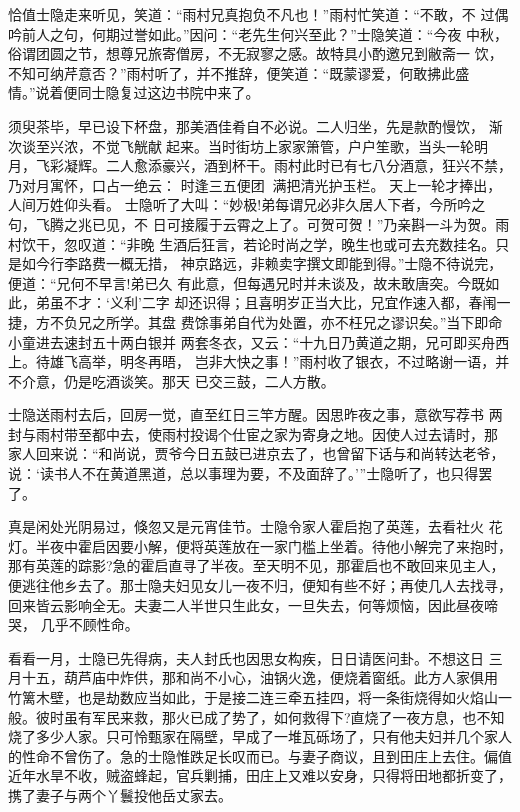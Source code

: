 恰值士隐走来听见，笑道：“雨村兄真抱负不凡也！”雨村忙笑道：“不敢，不
过偶吟前人之句，何期过誉如此。”因问：“老先生何兴至此？”士隐笑道：“今夜
中秋，俗谓团圆之节，想尊兄旅寄僧房，不无寂寥之感。故特具小酌邀兄到敝斋一
饮，不知可纳芹意否？”雨村听了，并不推辞，便笑道：“既蒙谬爱，何敢拂此盛
情。”说着便同士隐复过这边书院中来了。

须臾茶毕，早已设下杯盘，那美酒佳肴自不必说。二人归坐，先是款酌慢饮，
渐次谈至兴浓，不觉飞觥献起来。当时街坊上家家箫管，户户笙歌，当头一轮明
月，飞彩凝辉。二人愈添豪兴，酒到杯干。雨村此时已有七八分酒意，狂兴不禁，
乃对月寓怀，口占一绝云：
时逢三五便团，满把清光护玉栏。
天上一轮才捧出，人间万姓仰头看。
士隐听了大叫：“妙极!弟每谓兄必非久居人下者，今所吟之句，飞腾之兆已见，不
日可接履于云霄之上了。可贺可贺！”乃亲斟一斗为贺。雨村饮干，忽叹道：“非晚
生酒后狂言，若论时尚之学，晚生也或可去充数挂名。只是如今行李路费一概无措，
神京路远，非赖卖字撰文即能到得。”士隐不待说完，便道：“兄何不早言!弟已久
有此意，但每遇兄时并未谈及，故未敢唐突。今既如此，弟虽不才：‘义利’二字
却还识得；且喜明岁正当大比，兄宜作速入都，春闱一捷，方不负兄之所学。其盘
费馀事弟自代为处置，亦不枉兄之谬识矣。”当下即命小童进去速封五十两白银并
两套冬衣，又云：“十九日乃黄道之期，兄可即买舟西上。待雄飞高举，明冬再晤，
岂非大快之事！”雨村收了银衣，不过略谢一语，并不介意，仍是吃酒谈笑。那天
已交三鼓，二人方散。

士隐送雨村去后，回房一觉，直至红日三竿方醒。因思昨夜之事，意欲写荐书
两封与雨村带至都中去，使雨村投谒个仕宦之家为寄身之地。因使人过去请时，那
家人回来说：“和尚说，贾爷今日五鼓已进京去了，也曾留下话与和尚转达老爷，
说：‘读书人不在黄道黑道，总以事理为要，不及面辞了。’”士隐听了，也只得罢
了。

真是闲处光阴易过，倏忽又是元宵佳节。士隐令家人霍启抱了英莲，去看社火
花灯。半夜中霍启因要小解，便将英莲放在一家门槛上坐着。待他小解完了来抱时，
那有英莲的踪影?急的霍启直寻了半夜。至天明不见，那霍启也不敢回来见主人，
便逃往他乡去了。那士隐夫妇见女儿一夜不归，便知有些不好；再使几人去找寻，
回来皆云影响全无。夫妻二人半世只生此女，一旦失去，何等烦恼，因此昼夜啼哭，
几乎不顾性命。

看看一月，士隐已先得病，夫人封氏也因思女构疾，日日请医问卦。不想这日
三月十五，葫芦庙中炸供，那和尚不小心，油锅火逸，便烧着窗纸。此方人家俱用
竹篱木壁，也是劫数应当如此，于是接二连三牵五挂四，将一条街烧得如火焰山一
般。彼时虽有军民来救，那火已成了势了，如何救得下?直烧了一夜方息，也不知
烧了多少人家。只可怜甄家在隔壁，早成了一堆瓦砾场了，只有他夫妇并几个家人
的性命不曾伤了。急的士隐惟跌足长叹而已。与妻子商议，且到田庄上去住。偏值
近年水旱不收，贼盗蜂起，官兵剿捕，田庄上又难以安身，只得将田地都折变了，
携了妻子与两个丫鬟投他岳丈家去。

